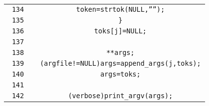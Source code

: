 \documentclass[a4paper,landscape]{article}
\begin{document}
\begin{longtable}{NC}
\texttt{ 134 }&\mbox{\texttt{ \hspace{3ex}\hspace{3ex}\hspace{3ex}\hspace{3ex}token\hspace{1ex}=\hspace{1ex}strtok(NULL,''\hspace{1ex}'');}}\\
\texttt{ 135 }&\mbox{\texttt{ \hspace{3ex}\hspace{3ex}\hspace{3ex}\}}}\\
\texttt{ 136 }&\mbox{\texttt{ \hspace{3ex}\hspace{3ex}\hspace{3ex}toks[j]\hspace{1ex}=\hspace{1ex}NULL;}}\\
\texttt{ 137 }&\mbox{\texttt{ }}\\
\texttt{ 138 }&\mbox{\texttt{ \hspace{3ex}\hspace{3ex}\hspace{1ex}**args;}}\\
\texttt{ 139 }&\mbox{\texttt{ \hspace{3ex}\hspace{3ex}(argfile\hspace{1ex}!=\hspace{1ex}NULL)\hspace{1ex}args\hspace{1ex}=\hspace{1ex}append\_args(j,toks);}}\\
\texttt{ 140 }&\mbox{\texttt{ \hspace{3ex}\hspace{3ex}\hspace{1ex}args\hspace{1ex}=\hspace{1ex}toks;}}\\
\texttt{ 141 }&\mbox{\texttt{ }}\\
\texttt{ 142 }&\mbox{\texttt{ \hspace{3ex}\hspace{3ex}(verbose)\hspace{1ex}print\_argv(args);}}\\

\end{longtable}
\end{document}
